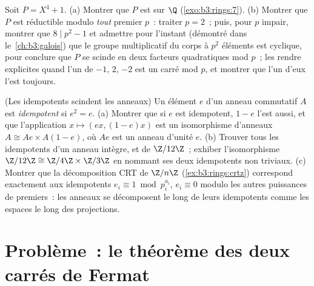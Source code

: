 \begin{exercise}[$\star\star\star$]\label{exo:b3:rings:11}
Soit $P = X^4 + 1$.
(a) Montrer que $P$ est  sur $\Q$
(\cref{exo:b3:rings:7}).
(b) Montrer que $P$ est réductible modulo \emph{tout} premier
$p$~: traiter $p = 2$~; puis, pour $p$ impair, montrer que $8
\mid p^2 - 1$ et admettre pour l'instant (démontré dans
le~\cref{ch:b3:galois}) que le groupe multiplicatif du corps à
$p^2$ éléments est cyclique, pour conclure que $P$ se scinde en
deux facteurs quadratiques mod $p$~; les rendre explicites
quand l'un de $-1$, $2$, $-2$ est un carré mod $p$, et montrer
que l'un d'eux l'est toujours.
\end{exercise}

\begin{exercise}[$\star\star$]\label{exo:b3:rings:12}
(Les idempotents scindent les anneaux) Un élément $e$ d'un
anneau commutatif $A$ est \emph{idempotent} si $e^2 = e$.
(a) Montrer que si $e$ est idempotent, $1 - e$ l'est aussi, et
que l'application $x \mapsto (ex, (1-e)x)$ est un isomorphisme
d'anneaux $A \cong Ae \times A(1-e)$, où $Ae$ est un anneau
d'unité $e$.
(b) Trouver tous les idempotents d'un anneau intègre, et de
$\Z/12\Z$~; exhiber l'isomorphisme $\Z/12\Z \cong \Z/4\Z \times
\Z/3\Z$ en nommant ses deux idempotents non triviaux.
(c) Montrer que la décomposition CRT de $\Z/n\Z$
(\cref{ex:b3:rings:crtz}) correspond exactement aux idempotents
$e_i \equiv 1 \bmod p_i^{a_i}$, $e_i \equiv 0$ modulo les
autres puissances de premiers~: les anneaux se décomposent le
long de leurs idempotents comme les espaces le long des
projections.
\end{exercise}

\section{Problème~: le théorème des deux carrés de Fermat}

